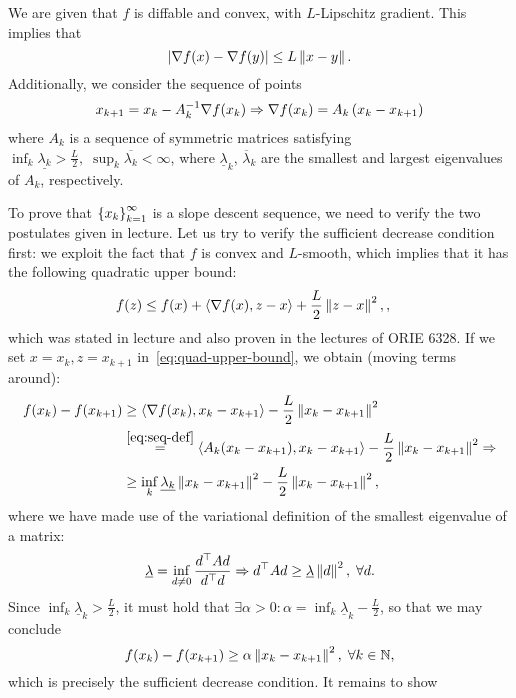 \documentclass[10pt]{article}
\begin{document}
\begin{Exercise}
	We are given that $f$ is diffable and convex, with $L$-Lipschitz gradient.
	This implies that
	\[
		\left| \nabla f(x) - \nabla f(y) \right| \leq L \left \| x - y \right \|.
	\]
	Additionally, we consider the sequence of points
	\begin{align}
		x_{k+1} = x_k - A_k^{-1} \nabla f(x_k) \Rightarrow
		\nabla f(x_k) = A_k \left(x_{k} - x_{k+1}\right)
		\label{eq:seq-def}
	\end{align}
	where $A_k$ is a sequence of symmetric matrices satisfying
	$\inf_k \underline{\lambda_k} > \frac{L}{2}, \; \sup_k \overline{\lambda_k}
	< \infty$, where $\underline{\lambda}_k$, $\overline{\lambda}_k$ are the
	smallest and largest eigenvalues of $A_k$, respectively.

	To prove that $\left\{ x_k \right\}_{k=1}^{\infty}$ is a slope descent sequence, we
	need to verify the two postulates given in lecture. Let us try to verify
	the sufficient decrease condition first: we exploit the fact that $f$ is
	convex and $L$-smooth, which implies that it has the following quadratic
	upper bound:
	\begin{align}
		f(z) &\leq f(x) + \left\langle \nabla f(x), z - x \right\rangle + \frac{L}{2} \left \| z - x \right \|^2,
		\label{eq:quad-upper-bound},
	\end{align}
	which was stated in lecture and also proven in the lectures of ORIE 6328.
	If we set $x = x_k, z = x_{k+1}$ in~\cref{eq:quad-upper-bound}, we obtain
	(moving terms around):
	\begin{align*}
		f(x_k) - f(x_{k+1}) &\geq \ip{\grad f(x_k), x_{k} - x_{k+1}}
			- \frac{L}{2} \norm{x_k - x_{k+1}}^2 \\
			&\overset{\cref{eq:seq-def}}{=} \ip{A_k (x_{k} - x_{k+1}), x_k -
		x_{k+1}} - \frac{L}{2} \norm{x_k - x_{k+1}}^2 \Rightarrow \\
			&\geq \inf_k \underline{\lambda_k} \norm{x_k - x_{k+1}}^2
			- \frac{L}{2} \norm{x_k - x_{k+1}}^2,
	\end{align*}
	where we have made use of the variational definition of the smallest
	eigenvalue of a matrix:
	\[
		\underline{\lambda} = \inf_{d \neq 0} \frac{d^\top A d}{d^\top d}
		\Rightarrow d^\top A d \geq \underline{\lambda} \left \| d \right \|^2, \; \forall
		d.
	\]
	Since $\inf_k \underline{\lambda}_k > \frac{L}{2}$, it must hold that
	$\exists \alpha > 0: \alpha = \inf_k \underline{\lambda}_k - \frac{L}{2}$,
	so that we may conclude
	\[
		f(x_k) - f(x_{k+1}) \geq \alpha \left \| x_k - x_{k+1} \right \|^2, \; \forall k
		\in \mathbb{N},
	\]
	which is precisely the sufficient decrease condition. It remains to show

\end{Exercise}
\end{document}
